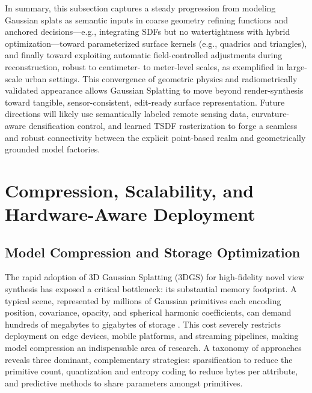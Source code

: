 \documentclass[11pt,a4paper]{article}
\begin{document}
In summary, this subsection captures a steady progression from modeling Gaussian splats as semantic inputs in coarse geometry refining functions and anchored decisions---e.g., integrating SDFs but no watertightness with hybrid optimization---toward parameterized surface kernels (e.g., quadrics and triangles), and finally toward exploiting automatic field-controlled adjustments during reconstruction, robust to centimeter- to meter-level scales, as exemplified in large-scale urban settings. This convergence of geometric physics and radiometrically validated appearance allows Gaussian Splatting to move beyond render-synthesis toward tangible, sensor-consistent, edit-ready surface representation. Future directions will likely use semantically labeled remote sensing data, curvature-aware densification control, and learned TSDF rasterization to forge a seamless and robust connectivity between the explicit point-based realm and geometrically grounded model factories.


\section{Compression, Scalability, and Hardware-Aware Deployment}



\subsection{Model Compression and Storage Optimization}


The rapid adoption of 3D Gaussian Splatting (3DGS) for high-fidelity novel view synthesis has exposed a critical bottleneck: its substantial memory footprint. A typical scene, represented by millions of Gaussian primitives each encoding position, covariance, opacity, and spherical harmonic coefficients, can demand hundreds of megabytes to gigabytes of storage \cite{arxiv:2308.04079v1}. This cost severely restricts deployment on edge devices, mobile platforms, and streaming pipelines, making model compression an indispensable area of research. A taxonomy of approaches reveals three dominant, complementary strategies: sparsification to reduce the primitive count, quantization and entropy coding to reduce bytes per attribute, and predictive methods to share parameters amongst primitives.
\end{document}
